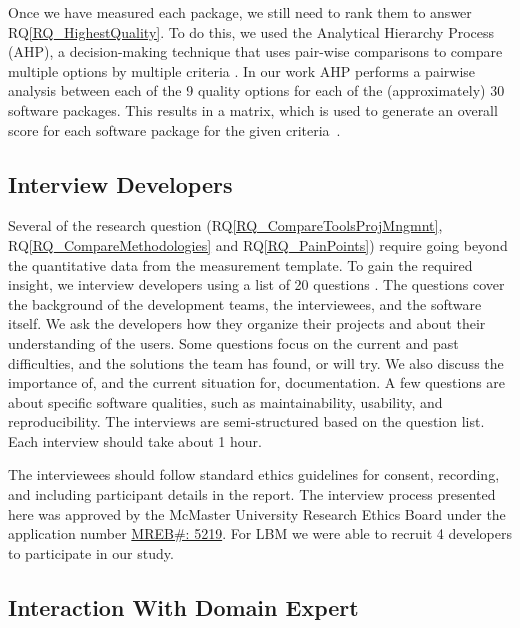 \documentclass[runningheads]{llncs}
\newcommand{\rqref}[1]{RQ\ref{#1}}
\begin{document}
Once we have measured each package, we still need to rank them to answer
\rqref{RQ_HighestQuality}.  To do this, we used the Analytical Hierarchy Process
(AHP), a decision-making technique that uses pair-wise comparisons to
compare multiple options by multiple criteria \cite{Saaty1980}. In our work AHP
performs a pairwise analysis between each of the 9 quality options for each of
the (approximately) 30 software packages.  This results in a matrix, which is
used to generate an overall score for each software package for the given
criteria~\cite{SmithEtAl2016}.

\subsection{Interview Developers} \label{SecSurvey}

Several of the research question (\rqref{RQ_CompareToolsProjMngmnt},
\rqref{RQ_CompareMethodologies} and \rqref{RQ_PainPoints}) require going beyond
the quantitative data from the measurement template. To gain the required
insight, we interview developers using a list of 20 questions
\cite{SmithEtAl2021}. The questions cover the background of the development
teams, the interviewees, and the software itself. We ask the developers how they
organize their projects and about their understanding of the users. Some
questions focus on the current and past difficulties, and the solutions the team
has found, or will try. We also discuss the importance of, and the current
situation for, documentation. A few questions are about specific software
qualities, such as maintainability, usability, and reproducibility. The
interviews are semi-structured based on the question list.  Each interview
should take about 1 hour.

The interviewees should follow standard ethics guidelines for consent,
recording, and including participant details in the report. The interview
process presented here was approved by the McMaster University Research Ethics
Board under the application number 
\href{https://github.com/smiths/AIMSS/blob/master/StateOfPractice/MACREM/Application.pdf}
{MREB\#: 5219}.  For LBM we were able to recruit 4 developers to participate in
our study.

\subsection{Interaction With Domain Expert} \label{sec_vet_software_list}
\end{document}
